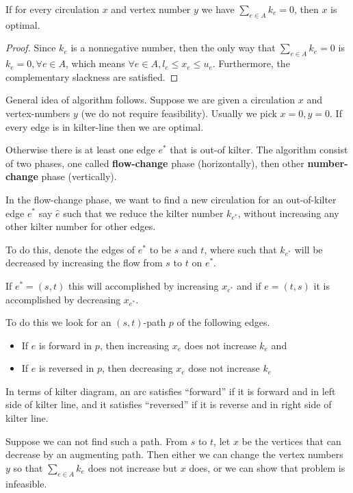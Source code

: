 				\begin{lemma}
					If for every circulation $x$ and vertex number $y$ we have $\sum_{e \in A} k_e = 0$, then $x$ is optimal.
				\end{lemma}

				\begin{proof}
					Since $k_e$ is a nonnegative number, then the only way that $\sum_{e \in A} k_e = 0$ is $k_e = 0, \forall e\in A$, which means $\forall e\in A, l_e \le x_e \le u_e$. Furthermore, the complementary slackness are satisfied.
				\end{proof}

				General idea of algorithm follows. Suppose we are given a circulation $x$ and vertex-numbers $y$ (we do not require feasibility). Usually we pick $x=0, y=0$. If every edge is in kilter-line then we are optimal.

				Otherwise there is at least one edge $e^*$ that is out-of kilter. The algorithm consist of two phases, one called \textbf{flow-change} phase (horizontally), then other \textbf{number-change} phase (vertically).

				In the flow-change phase, we want to find a new circulation for an out-of-kilter edge $e^*$ say $\hat{e}$ such that we reduce the kilter number $k_{e^*}$, without increasing any other kilter number for other edges.

				To do this, denote the edges of $e^*$ to be $s$ and $t$, where such that $k_{e^*}$ will be decreased by increasing the flow from $s$ to $t$ on $e^*$.

				If $e^*=(s, t)$ this will accomplished by increasing $x_{e^*}$ and if $e=(t, s)$ it is accomplished by decreasing $x_{e^*}$. 

				To do this we look for an $(s, t)$-path $p$ of the following edges.

				\begin{itemize}
					\item If $e$ is forward in $p$, then increasing $x_e$ does not increase $k_e$ and
					\item If $e$ is reversed in $p$, then decreasing $x_e$ dose not increase $k_e$
				\end{itemize}

				In terms of kilter diagram, an arc satisfies ``forward'' if it is forward and in left side of kilter line, and it satisfies ``reversed'' if it is reverse and in right side of kilter line.

				Suppose we can not find such a path. From $s$ to $t$, let $x$ be the vertices that can decrease by an augmenting path. Then either we can change the vertex numbers $y$ so that $\sum_{e\in A} k_e$ does not increase but $x$ does, or we can show that problem is infeasible.

